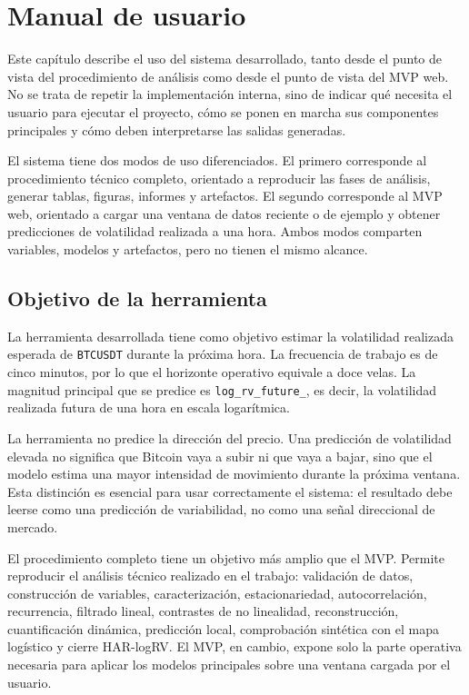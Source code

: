
\chapter{Manual de usuario}\label{cap:manual}

Este capítulo describe el uso del sistema desarrollado, tanto desde el punto de vista del procedimiento de análisis como desde el punto de vista del MVP web. No se trata de repetir la implementación interna, sino de indicar qué necesita el usuario para ejecutar el proyecto, cómo se ponen en marcha sus componentes principales y cómo deben interpretarse las salidas generadas.

El sistema tiene dos modos de uso diferenciados. El primero corresponde al procedimiento técnico completo, orientado a reproducir las fases de análisis, generar tablas, figuras, informes y artefactos. El segundo corresponde al MVP web, orientado a cargar una ventana de datos reciente o de ejemplo y obtener predicciones de volatilidad realizada a una hora. Ambos modos comparten variables, modelos y artefactos, pero no tienen el mismo alcance.

\section{Objetivo de la herramienta}\label{sec:objetivo-herramienta}

La herramienta desarrollada tiene como objetivo estimar la volatilidad realizada esperada de \texttt{BTCUSDT} durante la próxima hora. La frecuencia de trabajo es de cinco minutos, por lo que el horizonte operativo equivale a doce velas. La magnitud principal que se predice es \texttt{log\_\allowbreak rv\_\allowbreak future\_}, es decir, la volatilidad realizada futura de una hora en escala logarítmica.

La herramienta no predice la dirección del precio. Una predicción de volatilidad elevada no significa que Bitcoin vaya a subir ni que vaya a bajar, sino que el modelo estima una mayor intensidad de movimiento durante la próxima ventana. Esta distinción es esencial para usar correctamente el sistema: el resultado debe leerse como una predicción de variabilidad, no como una señal direccional de mercado.

El procedimiento completo tiene un objetivo más amplio que el MVP. Permite reproducir el análisis técnico realizado en el trabajo: validación de datos, construcción de variables, caracterización, estacionariedad, autocorrelación, recurrencia, filtrado lineal, contrastes de no linealidad, reconstrucción, cuantificación dinámica, predicción local, comprobación sintética con el mapa logístico y cierre HAR-logRV. El MVP, en cambio, expone solo la parte operativa necesaria para aplicar los modelos principales sobre una ventana cargada por el usuario.

